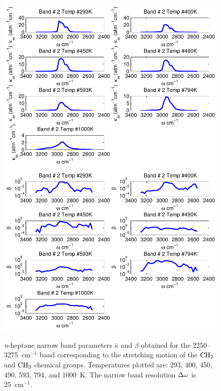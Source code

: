 \begin{figure}[p]
\begin{center}
\includegraphics[width=5.0in]{Figures/Heptane_Kappa_Band2_MALKMUS.pdf}
\includegraphics[width=5.0in]{Figures/Heptane_Beta_Band2_MALKMUS.pdf}
\end{center}
\caption{\textit{n}-heptane narrow band parameters $\bar{\kappa}$ and $\beta$ obtained for the 2250--3275~cm$^{-1}$ band corresponding to the stretching motion of the $\rm CH_2$ and $\rm CH_3$ chemical groups. Temperatures plotted are: 293, 400, 450, 490, 593, 794, and 1000~K. The narrow band resolution $\Delta \omega$ is 25~cm$^{-1}$.\label{fig:nheptane_kappa_beta2}}
\end{figure}

\FloatBarrier

